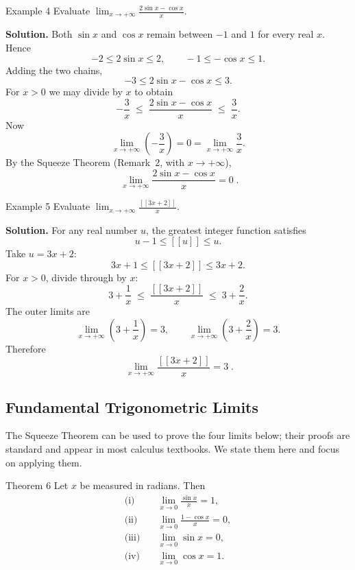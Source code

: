 \bigskip

\begin{examplebox}{Example 4}
Evaluate \(\displaystyle \lim_{x \to +\infty} \frac{2\sin x - \cos x}{x}\).

\medskip
\textbf{Solution.}
Both \(\sin x\) and \(\cos x\) remain between \(-1\) and \(1\) for every real \(x\). Hence
\[
-2 \leq 2\sin x \leq 2,
\qquad
-1 \leq -\cos x \leq 1.
\]
Adding the two chains,
\[
-3 \leq 2\sin x - \cos x \leq 3.
\]
For \(x > 0\) we may divide by \(x\) to obtain
\[
-\frac{3}{x}
\;\leq\;
\frac{2\sin x - \cos x}{x}
\;\leq\;
\frac{3}{x}.
\]
Now
\[
\lim_{x \to +\infty}\!\left(-\frac{3}{x}\right) = 0
= \lim_{x \to +\infty} \frac{3}{x}.
\]
By the Squeeze Theorem (Remark~2, with \(x \to +\infty\)),
\[
\boxed{\;\lim_{x \to +\infty} \frac{2\sin x - \cos x}{x} = 0\;}.
\]
\end{examplebox}

\begin{examplebox}{Example 5}
Evaluate \(\displaystyle \lim_{x \to +\infty} \frac{[\![3x + 2]\!]}{x}\).

\medskip
\textbf{Solution.}
For any real number \(u\), the greatest integer function satisfies
\[
u - 1 \leq [\![u]\!] \leq u.
\]
Take \(u = 3x + 2\):
\[
3x + 1 \leq [\![3x + 2]\!] \leq 3x + 2.
\]
For \(x > 0\), divide through by \(x\):
\[
3 + \frac{1}{x}
\;\leq\;
\frac{[\![3x + 2]\!]}{x}
\;\leq\;
3 + \frac{2}{x}.
\]
The outer limits are
\[
\lim_{x \to +\infty}\!\left(3 + \frac{1}{x}\right) = 3,
\qquad
\lim_{x \to +\infty}\!\left(3 + \frac{2}{x}\right) = 3.
\]
Therefore
\[
\boxed{\;\lim_{x \to +\infty} \frac{[\![3x + 2]\!]}{x} = 3\;}.
\]
\end{examplebox}

\subsection*{Fundamental Trigonometric Limits}
\label{subsec:1.6.2}

The Squeeze Theorem can be used to prove the four limits below; their proofs are standard and appear in most calculus textbooks. We state them here and focus on applying them.

\begin{theorembox}{Theorem 6}
\label{thm:trig-limits}
Let \(x\) be measured in radians. Then
\[
\begin{aligned}
\text{(i)}\quad &\lim_{x \to 0} \frac{\sin x}{x} = 1, \\[6pt]
\text{(ii)}\quad &\lim_{x \to 0} \frac{1 - \cos x}{x} = 0, \\[6pt]
\text{(iii)}\quad &\lim_{x \to 0} \sin x = 0, \\[6pt]
\text{(iv)}\quad &\lim_{x \to 0} \cos x = 1.
\end{aligned}
\]
\end{theorembox}

